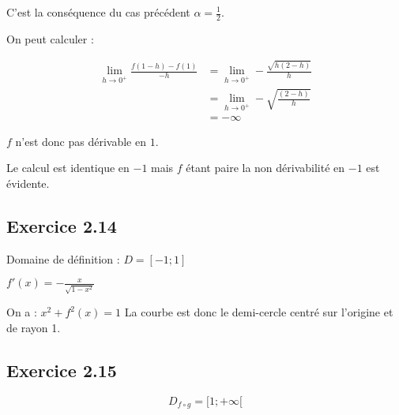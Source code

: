 \documentclass{report}
\begin{document}
C'est la conséquence du cas précédent $\alpha = \frac{1}{2}$.

On peut calculer :

\begin{equation*}
	\begin{split}
		\lim_{h \rightarrow 0^{+}} \frac{f(1-h) - f(1)}{-h}
			&= \lim_{h \rightarrow 0^{+}} -\frac{\sqrt{h(2-h)}}{h} \\
			&= \lim_{h \rightarrow 0^{+}} -\sqrt{\frac{(2-h)}{h}} \\
			&= -\infty
	\end{split}
\end{equation*}

$f$ n'est donc pas dérivable en $1$.

Le calcul est identique en $-1$ mais $f$ étant paire la non dérivabilité en $-1$ est évidente.


\subsection*{Exercice 2.14}

Domaine de définition : $D = [-1 ; 1]$

$f'(x) = -\frac{x}{\sqrt{1-x^2}}$



On a : $x^2 + f^2(x) = 1$
La courbe est donc le demi-cercle centré sur l'origine et de rayon 1.

\subsection*{Exercice 2.15}

\begin{displaymath}
	D_{f \circ g} = [1 ; +\infty[
\end{displaymath}
\end{document}
